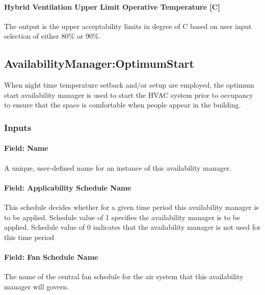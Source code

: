 \paragraph{Hybrid Ventilation Upper Limit Operative Temperature {[C]}}\label{hybrid-ventilation-upper-limit-operative-temperature}

The output is the upper acceptability limits in degree of C based on user input selection of either 80\% or 90\%.

\subsection{AvailabilityManager:OptimumStart}\label{availabilitymanageroptimumstart}

When night time temperature setback and/or setup are employed, the optimum start availability manager is used to start the HVAC system prior to occupancy to ensure that the space is comfortable when people appear in the building.

\subsubsection{Inputs}\label{inputs-11-020}

\paragraph{Field: Name}\label{field-name-10-017}

A unique, user-defined name for an instance of this availability manager.

\paragraph{Field: Applicability Schedule Name}\label{field-applicability-schedule-name-2}

This schedule decides whether for a given time period this availability manager is to be applied. Schedule value of 1 specifies the availability manager is to be applied. Schedule value of 0 indicates that the availability manager is not used for this time period

\paragraph{Field: Fan Schedule Name}\label{field-fan-schedule-name-1}

The name of the central fan schedule for the air system that this availability manager will govern.

